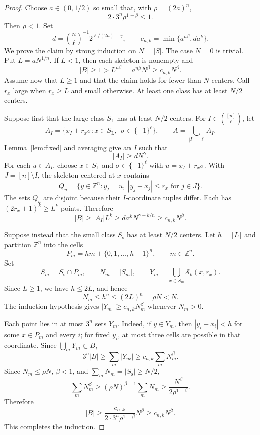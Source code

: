 \documentclass[11pt]{amsart}
\numberwithin{equation}{section}
\theoremstyle{plain}
\theoremstyle{definition}
\newcommand{\Z}{\mathbb{Z}}
\newcommand{\cS}{\mathcal{S}}
\begin{document}
\begin{proof}
Choose $a\in(0,1/2)$ so small that, with $\rho=(2a)^n$,
\[
 2\cdot3^n\rho^{1-\beta}\leq1.
\]
Then $\rho<1$.  Set
\[
 d=\binom{n}{\ell}^{-1}2^{\ell/(2n)-\gamma},
 \qquad
 c_{n,k}=\min\{a^{n\beta},da^k\}.
\]
We prove the claim by strong induction on $N=|S|$.  The case $N=0$ is
trivial.
Put $L=aN^{1/n}$.  If $L<1$, then each skeleton is nonempty and
\[
 |B|\geq1>L^{n\beta}=a^{n\beta}N^\beta\geq c_{n,k}N^\beta.
\]
Assume now that $L\geq1$ and that the claim holds for fewer than $N$ centers.
Call $r_x$ large when $r_x\geq L$ and small otherwise.  At least one class has
at least $N/2$ centers.

Suppose first that the large class $S_{\mathrm L}$ has at least $N/2$ centers.
For $I\in\binom{[n]}{\ell}$, let
\[
 A_I=\{x_I+r_x\sigma:x\in S_{\mathrm L},\
       \ \sigma\in\{\pm1\}^\ell\},
 \qquad
 A=\bigcup_{|I|=\ell}A_I.
\]
Lemma~\ref{lem:fixed} and averaging give an $I$ such that
\[
 |A_I|\geq dN^\gamma.
\]
For each $u\in A_I$, choose $x\in S_{\mathrm L}$ and
$\sigma\in\{\pm1\}^\ell$ with $u=x_I+r_x\sigma$.  With
$J=[n]\setminus I$, the skeleton centered at $x$ contains
\[
 Q_u=\{y\in\Z^n:y_I=u,\ |y_j-x_j|\leq r_x\text{ for }j\in J\}.
\]
The sets $Q_u$ are disjoint because their $I$-coordinate tuples differ.  Each
has $(2r_x+1)^k\geq L^k$ points.  Therefore
\[
 |B|\geq |A_I|L^k
 \geq da^kN^{\gamma+k/n}
 \geq c_{n,k}N^\beta.
\]

Suppose instead that the small class $S_{\mathrm s}$ has at least $N/2$
centers.  Let $h=\lceil L\rceil$ and partition $\Z^n$ into the cells
\[
 P_m=hm+\{0,1,\ldots,h-1\}^n,
 \qquad m\in\Z^n.
\]
Set
\[
 S_m=S_{\mathrm s}\cap P_m,
 \qquad
 N_m=|S_m|,
 \qquad
 Y_m=\bigcup_{x\in S_m}\cS_k(x,r_x).
\]
Since $L\geq1$, we have $h\leq2L$, and hence
\[
 N_m\leq h^n\leq(2L)^n=\rho N<N.
\]
The induction hypothesis gives $|Y_m|\geq c_{n,k}N_m^\beta$ whenever
$N_m>0$.

Each point lies in at most $3^n$ sets $Y_m$.  Indeed, if $y\in Y_m$, then
$|y_i-x_i|<h$ for some $x\in P_m$ and every $i$; for fixed $y_i$, at most
three cells are possible in that coordinate.  Since $\bigcup_m Y_m\subset B$,
\[
 3^n|B|\geq\sum_m |Y_m|
 \geq c_{n,k}\sum_m N_m^\beta.
\]
Since $N_m\leq\rho N$, $\beta<1$, and
$\sum_m N_m=|S_{\mathrm s}|\geq N/2$,
\[
 \sum_m N_m^\beta
 \geq(\rho N)^{\beta-1}\sum_m N_m
 \geq\frac{N^\beta}{2\rho^{1-\beta}}.
\]
Therefore
\[
 |B|\geq
 \frac{c_{n,k}}{2\cdot3^n\rho^{1-\beta}}N^\beta
 \geq c_{n,k}N^\beta.
\]
This completes the induction.
\end{proof}
\end{document}
